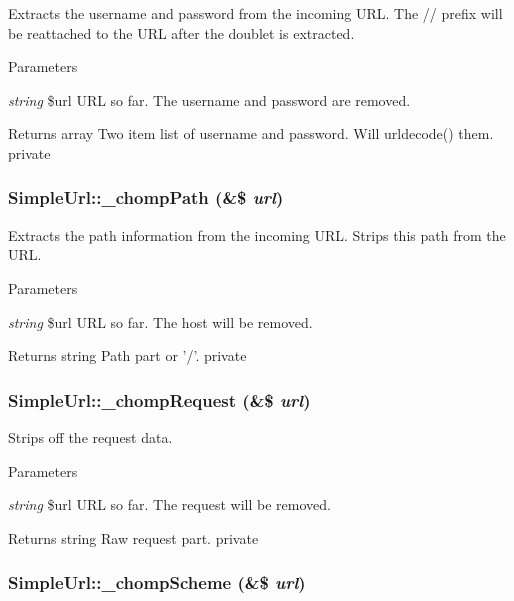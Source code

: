\label{class_simple_url_a8dc8cc4e853a2561bb60dd002dff5f5f}
Extracts the username and password from the incoming URL. The // prefix will be reattached to the URL after the doublet is extracted. 
\begin{DoxyParams}{Parameters}
\item[{\em string}]\$url URL so far. The username and password are removed. \end{DoxyParams}
\begin{DoxyReturn}{Returns}
array Two item list of username and password. Will urldecode() them.  private 
\end{DoxyReturn}
\hypertarget{class_simple_url_a3effa6cba4d038184dad7cc1d3e1b43f}{
\subsubsection[{\_\-chompPath}]{\setlength{\rightskip}{0pt plus 5cm}SimpleUrl::\_\-chompPath (\&\$ {\em url})}}
\label{class_simple_url_a3effa6cba4d038184dad7cc1d3e1b43f}
Extracts the path information from the incoming URL. Strips this path from the URL. 
\begin{DoxyParams}{Parameters}
\item[{\em string}]\$url URL so far. The host will be removed. \end{DoxyParams}
\begin{DoxyReturn}{Returns}
string Path part or '/'.  private 
\end{DoxyReturn}
\hypertarget{class_simple_url_ae1e8e486c7b72b481bef06317195aa59}{
\subsubsection[{\_\-chompRequest}]{\setlength{\rightskip}{0pt plus 5cm}SimpleUrl::\_\-chompRequest (\&\$ {\em url})}}
\label{class_simple_url_ae1e8e486c7b72b481bef06317195aa59}
Strips off the request data. 
\begin{DoxyParams}{Parameters}
\item[{\em string}]\$url URL so far. The request will be removed. \end{DoxyParams}
\begin{DoxyReturn}{Returns}
string Raw request part.  private 
\end{DoxyReturn}
\hypertarget{class_simple_url_abc9b0e3099de7c313a91c75dca8ddd30}{
\subsubsection[{\_\-chompScheme}]{\setlength{\rightskip}{0pt plus 5cm}SimpleUrl::\_\-chompScheme (\&\$ {\em url})}}
